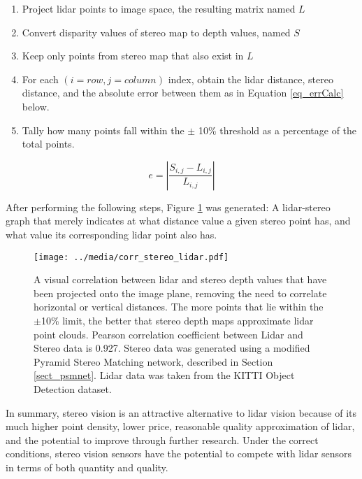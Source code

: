 \begin{enumerate} \itemsep=-0.5em
    \item Project lidar points to image space, the resulting matrix named $L$
    \item Convert disparity values of stereo map to depth values, named $S$
    \item Keep only points from stereo map that also exist in $L$
    \item For each $(i=row,j=column)$ index, obtain the lidar distance, stereo distance, and the absolute error between them as in Equation \ref{eq_errCalc} below.
    \item Tally how many points fall within the $\pm$ 10\% threshold as a percentage of the total points.
\end{enumerate}
\begin{equation}
    e = \left | \frac{S_{i,j} - L_{i,j}}{L_{i,j}} \right |
    \label{eq_errCalc}
\end{equation}

After performing the following steps, Figure \ref{corr_disp_lidar} was generated: A lidar-stereo graph that merely indicates at what distance value a given stereo point has, and what value its corresponding lidar point also has.

\begin{figure}[ht]
	\centering
	\texttt{[image: ../media/corr\_stereo\_lidar.pdf]}
	\caption{A visual correlation between lidar and stereo depth values that have been projected onto the image plane, removing the need to correlate horizontal or vertical distances. The more points that lie within the $\pm$10\% limit, the better that stereo depth maps approximate lidar point clouds. Pearson correlation coefficient between Lidar and Stereo data is 0.927. Stereo data was generated using a modified Pyramid Stereo Matching network, described in Section \ref{sect_psmnet}. Lidar data was taken from the KITTI Object Detection dataset.} %
	\label{corr_disp_lidar}
\end{figure}

In summary, stereo vision is an attractive alternative to lidar vision because of its much higher point density, lower price, reasonable quality approximation of lidar, and the potential to improve through further research. Under the correct conditions, stereo vision sensors have the potential to compete with lidar sensors in terms of both quantity and quality.




